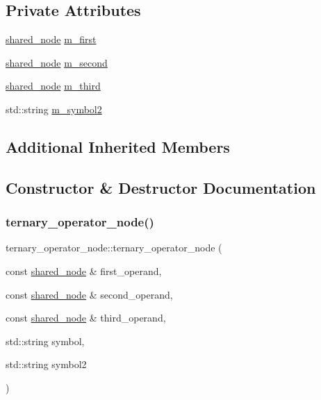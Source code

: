 \subsection*{Private Attributes}
\begin{DoxyCompactItemize}
\item 
\hyperlink{namespacejawe_a3f307481d921b6cbb50cc8511fc2b544}{shared\+\_\+node} \hyperlink{classjawe_1_1ternary__operator__node_ae2fd63c5210043d553c27e3f6aae5462}{m\+\_\+first}
\item 
\hyperlink{namespacejawe_a3f307481d921b6cbb50cc8511fc2b544}{shared\+\_\+node} \hyperlink{classjawe_1_1ternary__operator__node_adb78ea6e58ebd78a07b58eff1e7a17b1}{m\+\_\+second}
\item 
\hyperlink{namespacejawe_a3f307481d921b6cbb50cc8511fc2b544}{shared\+\_\+node} \hyperlink{classjawe_1_1ternary__operator__node_ab333bbfee61e3d3fdf01a393579212f6}{m\+\_\+third}
\item 
std\+::string \hyperlink{classjawe_1_1ternary__operator__node_ae7cbaace3f041dafcdc997139746e680}{m\+\_\+symbol2}
\end{DoxyCompactItemize}
\subsection*{Additional Inherited Members}


\subsection{Constructor \& Destructor Documentation}
\mbox{\label{classjawe_1_1ternary__operator__node_a17d9ed1359988f480eb0c29b4f9d40d3}} 
\subsubsection{\texorpdfstring{ternary\+\_\+operator\+\_\+node()}{ternary\_operator\_node()}}
{\footnotesize\ttfamily ternary\+\_\+operator\+\_\+node\+::ternary\+\_\+operator\+\_\+node (\begin{DoxyParamCaption}\item[{const \hyperlink{namespacejawe_a3f307481d921b6cbb50cc8511fc2b544}{shared\+\_\+node} \&}]{first\+\_\+operand,  }\item[{const \hyperlink{namespacejawe_a3f307481d921b6cbb50cc8511fc2b544}{shared\+\_\+node} \&}]{second\+\_\+operand,  }\item[{const \hyperlink{namespacejawe_a3f307481d921b6cbb50cc8511fc2b544}{shared\+\_\+node} \&}]{third\+\_\+operand,  }\item[{std\+::string}]{symbol,  }\item[{std\+::string}]{symbol2 }\end{DoxyParamCaption})}



